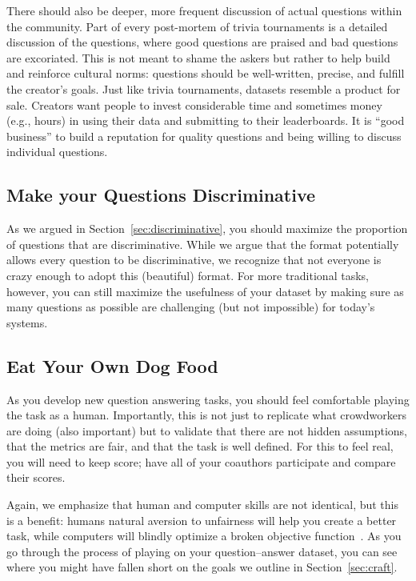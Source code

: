 There should also be deeper, more frequent discussion of actual questions within the  community.
Part of every post-mortem of trivia tournaments is a detailed discussion of the questions, where good questions are praised and bad questions are excoriated.
This is not meant to shame the askers but rather to help build and reinforce cultural norms: questions should be well-written, precise, and fulfill the creator's goals.
Just like trivia tournaments,  datasets resemble a product for sale.
Creators want people to invest considerable time and sometimes money (e.g.,  hours) in using their data and submitting to their leaderboards.
It is ``good business'' to build a reputation for quality questions and being willing to discuss individual questions.

\subsection{Make your Questions Discriminative}

As we argued in Section~\ref{sec:discriminative}, you should maximize the proportion of questions that are discriminative.
While we argue that the \qb{} format potentially allows every question to be discriminative, we recognize that not everyone is crazy enough to adopt this (beautiful) format.
For more traditional  tasks, however, you can still maximize the usefulness of your dataset by making sure as many questions as possible are challenging (but not impossible) for today's  systems.

\subsection{Eat Your Own Dog Food}

As you develop new question answering tasks, you should feel comfortable playing the task as a human.
Importantly, this is not just to replicate what crowdworkers are doing (also important) but to validate that there are not hidden assumptions, that the metrics are fair, and that the task is well defined.
For this to feel real, you will need to keep score; have all of your coauthors participate and compare their scores.

Again, we emphasize that human and computer skills are not identical, but this is a benefit: humans natural aversion to unfairness will help you create a better task, while computers will blindly optimize a broken objective function~\cite{bostrom-03}.
As you go through the process of playing on your question--answer dataset, you can see where you might have fallen short on the goals we outline in Section~\ref{sec:craft}.

